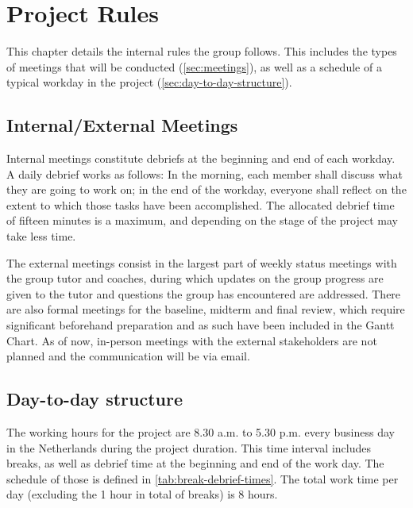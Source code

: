 \chapter{Project Rules}
This chapter details the internal rules the group follows. This includes the types of meetings that will be conducted (\autoref{sec:meetings}), as well as a schedule of a typical workday in the project (\autoref{sec:day-to-day-structure}).

\section{Internal/External Meetings}
\label{sec:meetings}
Internal meetings constitute debriefs at the beginning and end of each workday. A daily debrief works as follows: In the morning, each member shall discuss what they are going to work on; in the end of the workday, everyone shall reflect on the extent to which those tasks have been accomplished. The allocated debrief time of fifteen minutes is a maximum, and depending on the stage of the project  may take less time.

The external meetings consist in the largest part of weekly status meetings with the group tutor and coaches, during which updates on the group progress are given to the tutor and questions the group has encountered are addressed. There are also formal meetings for the baseline, midterm and final review, which require significant beforehand preparation and as such have been included in the Gantt Chart. As of now, in-person meetings with the external stakeholders are not planned and the communication will be via email.

\section{Day-to-day structure}
\label{sec:day-to-day-structure}
The working hours for the project are 8.30 a.m. to 5.30 p.m. every business day in the Netherlands during the project duration. This time interval includes breaks, as well as debrief time at the beginning and end of the work day. The schedule of those is defined in \autoref{tab:break-debrief-times}. The total work time per day (excluding the 1 hour in total of breaks) is 8 hours.




